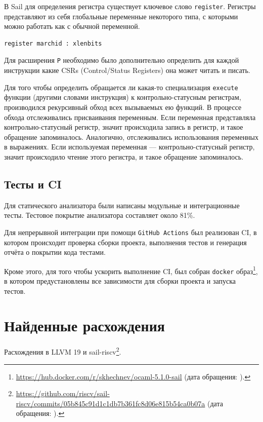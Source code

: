 В Sail для определения регистра существует ключевое слово \texttt{register}.
Регистры представляют из себя глобальные переменные некоторого типа, с которыми можно работать как с обычной переменной.

\begin{lstlisting}[caption={Пример определения регистра в sail-riscv}, language=sail]
register marchid : xlenbits
\end{lstlisting}

Для расширения \texttt{P} необходимо было дополнительно определить для каждой инструкции какие CSRs (Control/Status Registers) она может читать и писать.

Для того чтобы определить обращается ли какая-то специализация \texttt{execute} функции (другими словами инструкция) к контрольно-статусным регистрам, производился рекурсивный обход всех вызываемых ею функций.
В процессе обхода отслеживались присваивания переменным. Если переменная представляла контрольно-статусный регистр, значит происходила запись в регистр, и такое обращение запоминалось.
Аналогично, отслеживались использования переменных в выражениях.
Если используемая переменная --- контрольно-статусный регистр, значит происходило чтение этого регистра, и такое обращение запоминалось.


\subsection{Тесты и CI}

Для статического анализатора были написаны модульные и интеграционные тесты.
Тестовое покрытие анализатора составляет около 81\%.

Для непрерывной интеграции при помощи \texttt{GitHub Actions} был реализован CI, в котором происходит проверка сборки проекта, выполнения тестов и генерация отчёта о покрытии кода тестами.

Кроме этого, для того чтобы ускорить выполнение CI, был собран \texttt{docker} образ\footnote{\url{https://hub.docker.com/r/skhechnev/ocaml-5.1.0-sail} (дата обращения: ).}, в котором предустановлены все зависимости для сборки проекта и запуска тестов.


\section{Найденные расхождения}


Расхождения в LLVM 19 и sail-riscv\footnote{\url{https://github.com/riscv/sail-riscv/commits/05b845c91d1c1db7b361fc8d06e815b54ca0b07a} (дата обращения: ).}.

